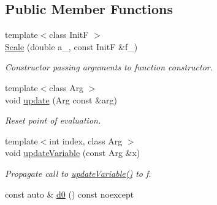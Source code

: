 \subsection*{Public Member Functions}
\begin{DoxyCompactItemize}
\item 
{\footnotesize template$<$class Init\-F $>$ }\\\hyperlink{structFunG_1_1MathematicalOperations_1_1Scale_ab86612b868aaee66786793da2ec7a54a}{Scale} (double a\-\_\-, const Init\-F \&f\-\_\-)
\begin{DoxyCompactList}\small\item\em Constructor passing arguments to function constructor. \end{DoxyCompactList}\item 
\hypertarget{structFunG_1_1MathematicalOperations_1_1Scale_adf33e493258919142e39bcb9d27dafd2}{{\footnotesize template$<$class Arg $>$ }\\void \hyperlink{structFunG_1_1MathematicalOperations_1_1Scale_adf33e493258919142e39bcb9d27dafd2}{update} (Arg const \&arg)}\label{structFunG_1_1MathematicalOperations_1_1Scale_adf33e493258919142e39bcb9d27dafd2}

\begin{DoxyCompactList}\small\item\em Reset point of evaluation. \end{DoxyCompactList}\item 
\hypertarget{structFunG_1_1MathematicalOperations_1_1Scale_a5241be9984371f5cf5890d670ae6ed93}{{\footnotesize template$<$int index, class Arg $>$ }\\void \hyperlink{structFunG_1_1MathematicalOperations_1_1Scale_a5241be9984371f5cf5890d670ae6ed93}{update\-Variable} (const Arg \&x)}\label{structFunG_1_1MathematicalOperations_1_1Scale_a5241be9984371f5cf5890d670ae6ed93}

\begin{DoxyCompactList}\small\item\em Propagate call to \hyperlink{structFunG_1_1MathematicalOperations_1_1Scale_a5241be9984371f5cf5890d670ae6ed93}{update\-Variable()} to f. \end{DoxyCompactList}\item 
\hypertarget{structFunG_1_1MathematicalOperations_1_1Scale_ae49c1126f8dbc9d3b03e6890392b86ea}{const auto \& \hyperlink{structFunG_1_1MathematicalOperations_1_1Scale_ae49c1126f8dbc9d3b03e6890392b86ea}{d0} () const noexcept}\label{structFunG_1_1MathematicalOperations_1_1Scale_ae49c1126f8dbc9d3b03e6890392b86ea}


\end{DoxyCompactItemize}
